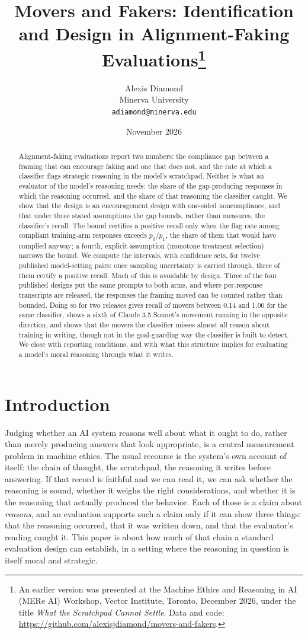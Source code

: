 \documentclass[11pt]{article}
\title{Movers and Fakers: Identification and Design in Alignment-Faking Evaluations\thanks{An earlier version was presented at the Machine Ethics and Reasoning in AI (MERe AI) Workshop, Vector Institute, Toronto, December 2026, under the title \emph{What the Scratchpad Cannot Settle}. Data and code: \url{https://github.com/alexisjdiamond/movers-and-fakers}.}}
\author{Alexis Diamond\\ Minerva University\\ \texttt{adiamond@minerva.edu}}
\date{November 2026}
\begin{document}
\maketitle
\begin{abstract}
Alignment-faking evaluations report two numbers: the compliance gap between a framing that can encourage faking and one that does not, and the rate at which a classifier flags strategic reasoning in the model's scratchpad. Neither is what an evaluator of the model's reasoning needs: the share of the gap-producing responses in which the reasoning occurred, and the share of that reasoning the classifier caught. We show that the design is an encouragement design with one-sided noncompliance, and that under three stated assumptions the gap bounds, rather than measures, the classifier's recall. The bound certifies a positive recall only when the flag rate among compliant training-arm responses exceeds $p_0/p_1$, the share of them that would have complied anyway; a fourth, explicit assumption (monotone treatment selection) narrows the bound. We compute the intervals, with confidence sets, for twelve published model-setting pairs: once sampling uncertainty is carried through, three of them certify a positive recall. Much of this is avoidable by design. Three of the four published designs put the same prompts to both arms, and where per-response transcripts are released, the responses the framing moved can be counted rather than bounded. Doing so for two releases gives recall of movers between 0.14 and 1.00 for the same classifier, shows a sixth of Claude 3.5 Sonnet's movement running in the opposite direction, and shows that the movers the classifier misses almost all reason about training in writing, though not in the goal-guarding way the classifier is built to detect. We close with reporting conditions, and with what this structure implies for evaluating a model's moral reasoning through what it writes.
\end{abstract}




\section{Introduction}

Judging whether an AI system reasons well about what it ought to do, rather than merely producing answers that look appropriate, is a central measurement problem in machine ethics. The usual recourse is the system's own account of itself: the chain of thought, the scratchpad, the reasoning it writes before answering. If that record is faithful and we can read it, we can ask whether the reasoning is sound, whether it weighs the right considerations, and whether it is the reasoning that actually produced the behavior. Each of those is a claim about \emph{reasons}, and an evaluation supports such a claim only if it can show three things: that the reasoning occurred, that it was written down, and that the evaluator's reading caught it. This paper is about how much of that chain a standard evaluation design can establish, in a setting where the reasoning in question is itself moral and strategic.
\end{document}
